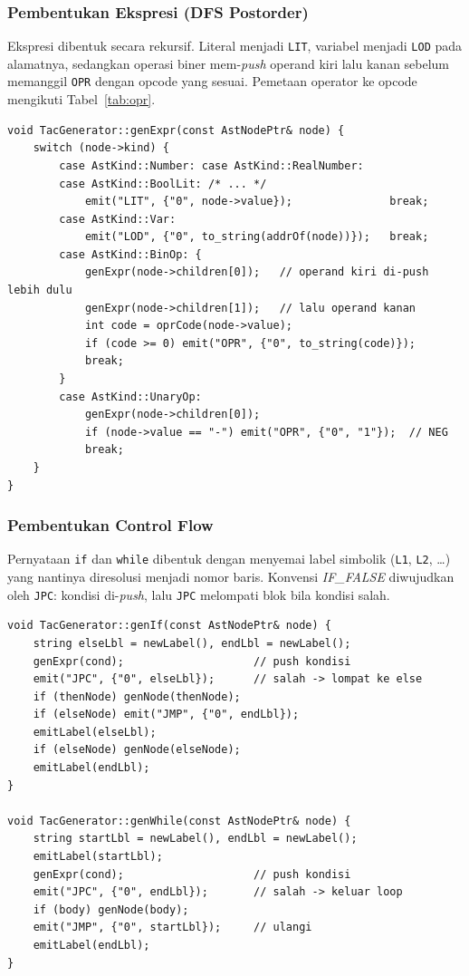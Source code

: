 \subsubsection{Pembentukan Ekspresi (DFS Postorder)}

Ekspresi dibentuk secara rekursif. Literal menjadi \texttt{LIT}, variabel menjadi
\texttt{LOD} pada alamatnya, sedangkan operasi biner mem-\emph{push} operand kiri
lalu kanan sebelum memanggil \texttt{OPR} dengan opcode yang sesuai. Pemetaan
operator ke opcode mengikuti Tabel~\ref{tab:opr}.

\begin{lstlisting}[style=kodeCpp, caption={Pembentukan ekspresi: hasil ditinggalkan di puncak stack.}]
void TacGenerator::genExpr(const AstNodePtr& node) {
    switch (node->kind) {
        case AstKind::Number: case AstKind::RealNumber:
        case AstKind::BoolLit: /* ... */
            emit("LIT", {"0", node->value});               break;
        case AstKind::Var:
            emit("LOD", {"0", to_string(addrOf(node))});   break;
        case AstKind::BinOp: {
            genExpr(node->children[0]);   // operand kiri di-push lebih dulu
            genExpr(node->children[1]);   // lalu operand kanan
            int code = oprCode(node->value);
            if (code >= 0) emit("OPR", {"0", to_string(code)});
            break;
        }
        case AstKind::UnaryOp:
            genExpr(node->children[0]);
            if (node->value == "-") emit("OPR", {"0", "1"});  // NEG
            break;
    }
}
\end{lstlisting}

\subsubsection{Pembentukan Control Flow}

Pernyataan \texttt{if} dan \texttt{while} dibentuk dengan menyemai label simbolik
(\texttt{L1}, \texttt{L2}, \dots) yang nantinya diresolusi menjadi nomor baris.
Konvensi \emph{IF\_FALSE} diwujudkan oleh \texttt{JPC}: kondisi di-\emph{push},
lalu \texttt{JPC} melompati blok bila kondisi salah.

\begin{lstlisting}[style=kodeCpp, caption={Pembentukan \texttt{if-else} dan \texttt{while} dengan label \& jump.}]
void TacGenerator::genIf(const AstNodePtr& node) {
    string elseLbl = newLabel(), endLbl = newLabel();
    genExpr(cond);                    // push kondisi
    emit("JPC", {"0", elseLbl});      // salah -> lompat ke else
    if (thenNode) genNode(thenNode);
    if (elseNode) emit("JMP", {"0", endLbl});
    emitLabel(elseLbl);
    if (elseNode) genNode(elseNode);
    emitLabel(endLbl);
}

void TacGenerator::genWhile(const AstNodePtr& node) {
    string startLbl = newLabel(), endLbl = newLabel();
    emitLabel(startLbl);
    genExpr(cond);                    // push kondisi
    emit("JPC", {"0", endLbl});       // salah -> keluar loop
    if (body) genNode(body);
    emit("JMP", {"0", startLbl});     // ulangi
    emitLabel(endLbl);
}
\end{lstlisting}


